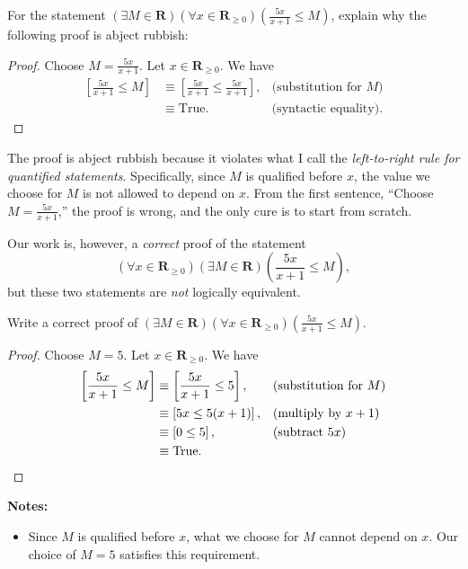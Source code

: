 \documentclass[12pt,fleqn,answers]{exam}
\newcommand{\reals}{\mathbf{R}}
\newcommand{\true}{\mathrm{True}}
\renewenvironment{solution}
  {\begin{shaded*}} %
  {\end{shaded*}}   %
\begin{document}
\begin{questions}

\question[10] For the statement  \(\left(\exists M \in \reals  \right)
\left(\forall x \in \reals_{\geq 0} \right) \left(\frac{5 x}{x+1} \leq M \right)\), explain why
the following proof is abject rubbish:
\begin{proof} Choose $M = \frac{5 x}{x+1}$. Let  $x \in \reals_{\geq 0}$. We have
\begin{align*}
 \left[\frac{5 x}{x+1} \leq M  \right] &\equiv
 \left[\frac{5 x}{x+1} \leq  \frac{5 x}{x+1}  \right],  &\mbox{(substitution for $M$)} \\
 &\equiv \mbox{True}. &\mbox{(syntactic equality)}. 
\end{align*}  \qedhere
\end{proof}


\begin{solution} The proof is abject rubbish because it violates
  what I call the \emph{left-to-right rule for quantified statements}. 
  Specifically, since $M$ is qualified before $x$,
  the value we choose for $M$ is not allowed to depend on $x$. From the first 
  sentence, ``Choose $M = \frac{5 x}{x+1}$,''   the proof is wrong, and the only
  cure is to start from scratch.
 

  \quad Our work is, however, a \emph{correct} proof of the statement 
  \begin{equation}
  \left(\forall x \in \reals_{\geq 0} \right) \left(\exists M \in \reals  \right)
 \left(\frac{5 x}{x+1} \leq M \right),
\end{equation}
but these two statements are \emph{not} logically equivalent.
 
\end{solution}



\question[10] Write a correct proof of \(\left(\exists M \in \reals\right)
\left(\forall x \in \reals_{\geq 0} \right) \left(\frac{5 x}{x+1} \leq  M \right)\).

\begin{solution} 

\begin{proof} Choose $M = 5$. Let $x \in \reals_{\geq 0}$. 
  We have
  \begin{align*}
     \left[\frac{5 x}{x+1} \leq  M \right]
       &\equiv \left[\frac{5 x}{x+1} \leq  5 \right], &&\text{(substitution for $M$)} \\
       &\equiv \left[5 x \leq  5 (x+1) \right], &&\text{(multiply by $x+1$)} \\
       &\equiv \left[ 0 \leq 5 \right], &&\text{(subtract $5 x$)} \\
       &\equiv \true. \qedhere 
  \end{align*}
\end{proof}
\textbf{Notes:}
\begin{itemize}
\item Since $M$ is qualified before $x$, what we choose for $M$ cannot depend
on $x$. Our choice of $M = 5$ satisfies this requirement.


\end{itemize}
\end{solution}
\end{questions}
\end{document}
